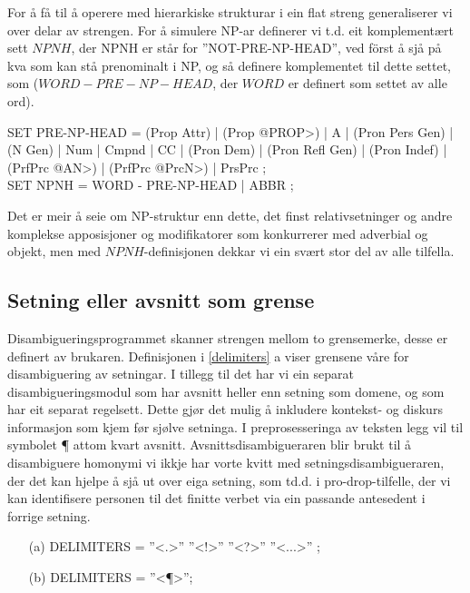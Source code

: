 \documentclass[a4paper,nynorsk]{article}
\begin{document}
For å få til å operere med hierarkiske strukturar i ein flat streng generaliserer vi over delar av strengen. For å simulere NP-ar definerer vi t.d. eit komplementært sett $NPNH$, der NPNH er står for ''NOT-PRE-NP-HEAD'', ved först å sjå på kva som kan stå prenominalt i NP, og så definere komplementet til dette settet, som ($WORD - PRE-NP-HEAD$, der $WORD$ er definert som settet av alle ord). %

\begin{example}
SET PRE-NP-HEAD = (Prop Attr) | (Prop @PROP>) | A | (Pron Pers Gen) | (N Gen) | 
                  Num | Cmpnd | CC | (Pron Dem)  | (Pron Refl Gen) | 
                  (Pron Indef) | (PrfPrc @AN>) |  (PrfPrc @PrcN>) | PrsPrc ; \\
SET NPNH        = WORD - PRE-NP-HEAD | ABBR ; \\                 
\end{example}

Det er meir å seie om NP-struktur enn dette, det finst relativsetninger og andre komplekse apposisjoner og modifikatorer som konkurrerer med adverbial og objekt, men med $NPNH$-definisjonen dekkar vi ein svært stor del av alle tilfella. %

\subsection{Setning eller avsnitt som grense}

Disambigueringsprogrammet skanner strengen mellom to grensemerke, desse er definert av brukaren. Definisjonen i \ref{delimiters} a viser grensene våre for disambiguering av setningar. I tillegg til det har vi ein separat disambigueringsmodul som har avsnitt heller enn setning som domene, og som har eit separat regelsett. Dette gjør det mulig å inkludere kontekst- og diskurs informasjon som kjem før sjølve setninga. I preprosesseringa av teksten legg vil til symbolet ¶ attom kvart avsnitt. Avsnittsdisambigueraren blir brukt til å disambiguere homonymi vi ikkje har vorte kvitt med setningsdisambigueraren, der det kan hjelpe å sjå ut over eiga setning, som td.d. i pro-drop-tilfelle, der vi kan identifisere personen til det finitte verbet via ein passande antesedent i forrige setning. %


\begin{example}\label{delimiters}
\begin{itemize}
\item[(a)] {DELIMITERS = ''<.>'' ''<!>'' ''<?>'' ''<...>'' ;}
\item[(b)] {DELIMITERS = ''<¶>'';}
\end{itemize}
\end{example}
\end{document}
